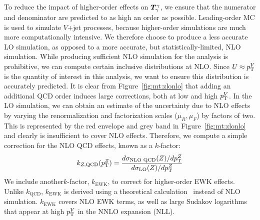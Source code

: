 To reduce the impact of higher-order effects on $\bm{T}^{\gamma}_{\gamma}$, we ensure that the numerator and denominator are predicted to as high an order as possible.
Leading-order MC is used to simulate $V$+jet processes, because higher-order simulations are much more computationally intensive.
We therefore choose to produce a less accurate LO simulation, as opposed to a more accurate, but statistically-limited, NLO simulation.
While producing sufficient NLO simulation for the analysis is prohibitive, we can compute certain inclusive distributions at NLO.
Since $U\approx p_\mathrm{T}^V$ is the quantity of interest in this analysis, we want to ensure this distribution is accurately predicted.
It is clear from Figure~\ref{fig:mt:zlonlo} that adding an additional QCD order induces large corrections, both at low and high $p_\mathrm{T}^V$.
In the LO simulation, we can obtain an estimate of the uncertainty due to NLO effects by varying the renormalization and factorization scales ($\mu_R,\mu_F$) by factors of two.
This is represented by the red envelope and grey band in Figure~\ref{fig:mt:zlonlo} and clearly is insufficient to cover NLO effects.
Therefore, we compute a simple correction for the NLO QCD effects, known as a $k$-factor:
\begin{equation}
    k_{Z,\mathrm{QCD}}(p_\mathrm{T}^Z) = \frac{d\sigma_\text{NLO QCD}(Z) / dp_\mathrm{T}^Z}{d\sigma_\mathrm{LO}(Z) / dp_\mathrm{T}^Z}
\end{equation}
We include another$k$-factor, $k_\mathrm{EWK}$, to correct for higher-order EWK effects.
Unlike $k_\mathrm{QCD}$, $k_\mathrm{EWK}$ is derived using a theoretical calculation~\cite{ewk2,ewk3,ewk1} instead of NLO simulation.
$k_\mathrm{EWK}$ covers NLO EWK terms, as well as large Sudakov logarithms that appear at high $p_\mathrm{T}^V$ in the NNLO expansion (NLL).

